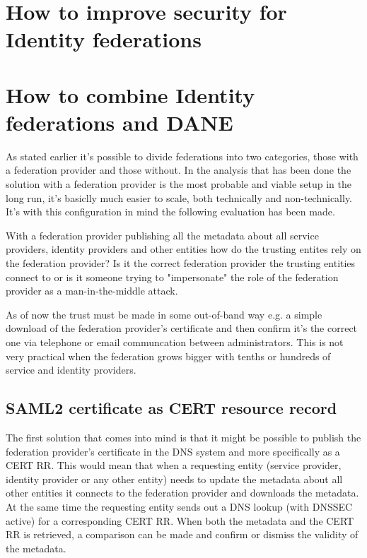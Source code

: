 \section{How to improve security for Identity federations}
\section{How to combine Identity federations and DANE}
As stated earlier it's possible to divide federations into two categories, those with a federation provider and those without.
In the analysis that has been done the solution with a federation provider is the most probable and viable setup in the long run, it's basiclly much easier to scale, both technically and non-technically.
It's with this configuration in mind the following evaluation has been made.


With a federation provider publishing all the metadata about all service providers, identity providers and other entities how do the trusting entites rely on the federation provider?
Is it the correct federation provider the trusting entities connect to or is it someone trying to "impersonate" the role of the federation provider as a man-in-the-middle attack.

As of now the trust must be made in some out-of-band way e.g. a simple download of the federation provider's certificate and then confirm it's the correct one via telephone or email communcation between administrators.  This is not very practical when the federation grows bigger with tenths or hundreds of service and identity providers.  
\subsection{SAML2 certificate as CERT resource record}
\label{subsec:saml2-certificate-as-tlsa}
The first solution that comes into mind is that it might be possible to publish the federation provider's certificate in the DNS system and more specifically as a CERT RR\cite{rfc:4398}.
This would mean that when a requesting entity (service provider, identity provider or any other entity) needs to update the metadata about all other entities it connects to the federation provider and downloads the metadata.
At the same time the requesting entity sends out a DNS lookup (with DNSSEC active) for a corresponding CERT RR.
When both the metadata and the CERT RR is retrieved, a comparison can be made and confirm or dismiss the validity of the metadata.

